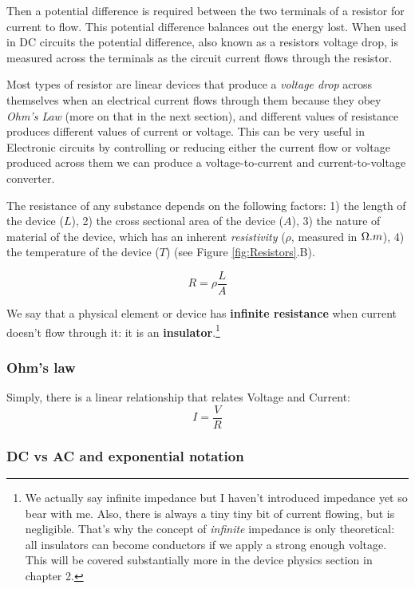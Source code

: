 Then a potential difference is required between the two terminals of a resistor for current to flow. This potential difference balances out the energy lost. When used in DC circuits the potential difference, also known as a resistors voltage drop, is measured across the terminals as the circuit current flows through the resistor.

Most types of resistor are linear devices that produce a \textit{voltage drop} across themselves when an electrical current flows through them because they obey \textit{Ohm’s Law} (more on that in the next section), and different values of resistance produces different values of current or voltage. This can be very useful in Electronic circuits by controlling or reducing either the current flow or voltage produced across them we can produce a voltage-to-current and current-to-voltage converter.

The resistance of any substance depends on the following factors: 1) the length of the device ($L$), 2) the cross sectional area of the device ($A$), 3) the nature of material of the device, which has an inherent \textit{resistivity} ($\rho$, measured in $\ohm.m$), 4) the temperature of the device ($T$) (see Figure \ref{fig:Resistors}.B). 

\begin{equation}
    R = \rho \frac{L}{A}
\end{equation}

We say that a physical element or device has \textbf{infinite resistance} when current doesn't flow through it: it is an \textbf{insulator}.\footnote{We actually say infinite impedance but I haven't introduced impedance yet so bear with me. Also, there is always a tiny tiny bit of current flowing, but is negligible. That's why the concept of \textit{infinite} impedance is only theoretical: all insulators can become conductors if we apply a strong enough voltage. This will be covered substantially more in the device physics section in chapter 2.}

\subsubsection{Ohm's law}

Simply, there is a linear relationship that relates Voltage and Current: 
\begin{equation}
    I = \frac{V}{R}
\end{equation}

\subsubsection{DC vs AC and exponential notation}

